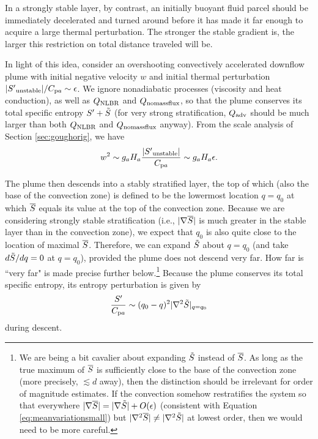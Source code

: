 \documentclass[12pt]{article}
\newcommand{\heatnlbr}{Q_{\rm NLBR}}
\newcommand{\heatnomassflux}{Q_{\rm nomassflux}}
\newcommand{\heatadv}{Q_{\rm adv}}
\newcommand{\cpa}{C_{{\rm p}a}}
\newcommand{\sunstable}{|\entrprime_{\rm unstable}|}
\begin{document}
In a strongly stable layer, by contrast, an initially buoyant fluid parcel should be immediately decelerated and turned around before it has made it far enough to acquire a large thermal perturbation. The stronger the stable gradient is, the larger this restriction on total distance traveled will be. 

In light of this idea, consider an overshooting convectively accelerated downflow plume with initial negative velocity $w$ and initial thermal perturbation $\sunstable/\cpa\sim\epsilon$. We ignore nonadiabatic processes (viscosity and heat conduction), as well as $\heatnlbr$ and $\heatnomassflux$, so that the plume conserves its total specific entropy ${S^\prime} + \tilde{S}$ (for very strong stratification, $\heatadv$ should be much larger than both $\heatnlbr$ and $\heatnomassflux$ anyway). From the scale analysis of Section \ref{sec:goughorig}, we have
\begin{align}
	w^2 \sim g_a H_a \frac{\sunstable}{\cpa} \sim g_aH_a\epsilon.
\end{align}

The plume then descends into a stably stratified layer, the top of which (also the base of the convection zone) is defined to be the lowermost location $q=q_0$ at which $\overline{S}$ equals its value at the top of the convection zone. Because we are considering strongly stable stratification (i.e., $|\nabla\overline{S}|$ is much greater in the stable layer than in the convection zone), we expect that $q_0$ is also quite close to the location of maximal $\overline{S}$. Therefore, we can expand $\tilde{S}$ about $q=q_0$ (and take $d\tilde{S}/dq=0$ at $q=q_0$), provided the plume does not descend very far. How far is ``very far" is made precise further below.\footnote{We are being a bit cavalier about expanding $\tilde{S}$ instead of $\overline{S}$. As long as the true maximum of $\overline{S}$ is sufficiently close to the base of the convection zone (more precisely, $\lesssim d$ away), then the distinction should be irrelevant for order of magnitude estimates. If the convection somehow restratifies the system so that everywhere $|\nabla\overline{S}|=|\nabla\tilde{S}| + O(\epsilon)$ (consistent with Equation \eqref{eq:meanvariationsmall}) but $|\nabla^2\overline{S}|\neq|\nabla^2\tilde{S}|$ at lowest order, then we would need to be more careful.} Because the plume conserves its total specific entropy, its entropy perturbation is given by 
\begin{align}\label{eq:sdescent1}
	\frac{\entrprime}{\cpa}\sim(q_0-q)^2|\nabla^2\entrtilde|_{q=q_0}
\end{align}
during descent. 
\end{document}
